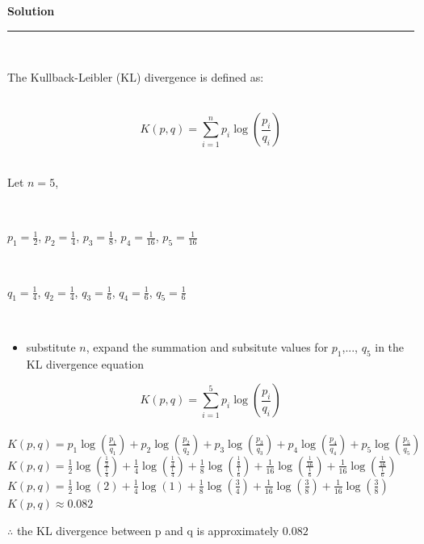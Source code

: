 \documentclass{article}
\begin{document}
\textbf{Solution}

\noindent\rule{\textwidth}{0.4pt}\\

\parbox{\textwidth}{The Kullback-Leibler (KL) divergence is defined as:}\\

$$K(p,q) = \sum^n_{i=1} p_i \log\left(\frac{p_i}{q_i}\right)$$\\


\parbox{\textwidth}{Let $n = 5$,}\\

\parbox{\textwidth}{$p_1 = \frac{1}{2}$, $p_2 = \frac{1}{4}$, $p_3 = \frac{1}{8}$, $p_4 = \frac{1}{16}$, $p_5 = \frac{1}{16}$}\\

\parbox{\textwidth}{$q_1 = \frac{1}{4}$, $q_2 = \frac{1}{4}$, $q_3 = \frac{1}{6}$, $q_4 = \frac{1}{6}$, $q_5 = \frac{1}{6}$}\\

\begin{itemize}
    \item {substitute $n$, expand the summation and subsitute values for $p_1$,..., $q_5$ in the KL divergence equation}\\
\end{itemize}

$$K(p,q) = \sum^5_{i=1} p_i \log\left(\frac{p_i}{q_i}\right)$$\\

$K(p,q) = p_1 \log\left(\frac{p_1}{q_1}\right) + p_2 \log\left(\frac{p_2}{q_2}\right) + p_3 \log\left(\frac{p_3}{q_3}\right) + p_4 \log\left(\frac{p_4}{q_4}\right) + p_5 \log\left(\frac{p_5}{q_5}\right)$\\

$K(p,q) = \frac{1}{2} \log\left(\frac{\frac{1}{2}}{\frac{1}{4}}\right) + \frac{1}{4} \log\left(\frac{\frac{1}{4}}{\frac{1}{4}}\right) + \frac{1}{8} \log\left(\frac{\frac{1}{8}}{\frac{1}{6}}\right) + \frac{1}{16} \log\left(\frac{\frac{1}{16}}{\frac{1}{6}}\right) + \frac{1}{16} \log\left(\frac{\frac{1}{16}}{\frac{1}{6}}\right)$\\

$K(p,q) = \frac{1}{2} \log(2) + \frac{1}{4} \log(1) + \frac{1}{8} \log\left(\frac{3}{4}\right) + \frac{1}{16} \log\left(\frac{3}{8}\right) + \frac{1}{16} \log\left(\frac{3}{8}\right)$\\

$K(p,q) \approx 0.082$\\

\parbox{\textwidth}{$\therefore$ the KL divergence between p and q is approximately $0.082$ }\\
\end{document}
